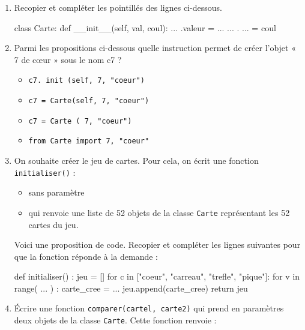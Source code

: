 \documentclass[
  a4paper,
  DIV=11,
  numbers=noendperiod]{scrartcl}
\newenvironment{Shaded}{\begin{snugshade}}{\end{snugshade}}
\newcommand{\BuiltInTok}[1]{\textcolor[rgb]{0.00,0.23,0.31}{#1}}
\newcommand{\ControlFlowTok}[1]{\textcolor[rgb]{0.00,0.23,0.31}{#1}}
\newcommand{\FunctionTok}[1]{\textcolor[rgb]{0.28,0.35,0.67}{#1}}
\newcommand{\KeywordTok}[1]{\textcolor[rgb]{0.00,0.23,0.31}{#1}}
\newcommand{\NormalTok}[1]{\textcolor[rgb]{0.00,0.23,0.31}{#1}}
\newcommand{\OperatorTok}[1]{\textcolor[rgb]{0.37,0.37,0.37}{#1}}
\newcommand{\StringTok}[1]{\textcolor[rgb]{0.13,0.47,0.30}{#1}}
\newcommand{\VariableTok}[1]{\textcolor[rgb]{0.07,0.07,0.07}{#1}}
\providecommand{\tightlist}{%
  \setlength{\itemsep}{0pt}\setlength{\parskip}{0pt}}\usepackage{longtable,booktabs,array}
\begin{document}
\begin{enumerate}
\def\labelenumi{\arabic{enumi}.}
\item
  Recopier et compléter les pointillés des lignes ci-dessous.

\begin{Shaded}
\begin{Highlighting}[]
\KeywordTok{class}\NormalTok{ Carte:}
    \KeywordTok{def} \FunctionTok{\_\_init\_\_}\NormalTok{(}\VariableTok{self}\NormalTok{, val, coul):}
\NormalTok{        ... .valeur }\OperatorTok{=}\NormalTok{ ...}
\NormalTok{        ... . ... }\OperatorTok{=}\NormalTok{ coul}
\end{Highlighting}
\end{Shaded}
\item
  Parmi les propositions ci-dessous quelle instruction permet de créer
  l'objet « 7 de cœur » sous le nom c7 ?

  \begin{itemize}
  \tightlist
  \item
    \texttt{c7.\ init\ (self,\ 7,\ "coeur")}
  \item
    \texttt{c7\ =\ Carte(self,\ 7,\ "coeur")}
  \item
    \texttt{c7\ =\ Carte\ (\ 7,\ "coeur")}
  \item
    \texttt{from\ Carte\ import\ 7,\ "coeur"}
  \end{itemize}
\item
  On souhaite créer le jeu de cartes. Pour cela, on écrit une fonction
  \texttt{initialiser()} :

  \begin{itemize}
  \tightlist
  \item
    sans paramètre
  \item
    qui renvoie une liste de 52 objets de la classe \texttt{Carte}
    représentant les 52 cartes du jeu.
  \end{itemize}

  Voici une proposition de code. Recopier et compléter les lignes
  suivantes pour que la fonction réponde à la demande :

\begin{Shaded}
\begin{Highlighting}[]
\KeywordTok{def}\NormalTok{ initialiser() :}
\NormalTok{    jeu }\OperatorTok{=}\NormalTok{ [] }
    \ControlFlowTok{for}\NormalTok{ c }\KeywordTok{in}\NormalTok{ [}\StringTok{"coeur"}\NormalTok{, }\StringTok{"carreau"}\NormalTok{, }\StringTok{"trefle"}\NormalTok{, }\StringTok{"pique"}\NormalTok{]:}
        \ControlFlowTok{for}\NormalTok{ v }\KeywordTok{in} \BuiltInTok{range}\NormalTok{( ... ) :}
\NormalTok{            carte\_cree }\OperatorTok{=}\NormalTok{ ...}
\NormalTok{            jeu.append(carte\_cree)}
    \ControlFlowTok{return}\NormalTok{ jeu}
\end{Highlighting}
\end{Shaded}
\item
  Écrire une fonction \texttt{comparer(cartel,\ carte2)} qui prend en
  paramètres deux objets de la classe \texttt{Carte}. Cette fonction
  renvoie :


\end{enumerate}
\end{document}

